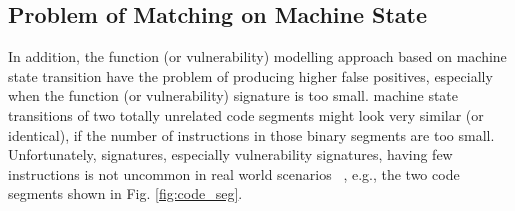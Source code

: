 \subsection{Problem of Matching on Machine State }
In addition, the function (or vulnerability) modelling approach based on machine state transition have the problem of producing higher false positives, especially when the function (or vulnerability) signature is too small. {\color{red}{Due to the lack of explicit program semantics at binary level,}} machine state transitions of two totally unrelated code segments might look very similar (or identical), if the number of instructions in those binary segments are too small. Unfortunately, signatures, especially vulnerability signatures, having few instructions is not uncommon in real world scenarios ~\cite{pewnycross}, e.g., the two code segments shown in Fig. \ref{fig:code_seg}.

